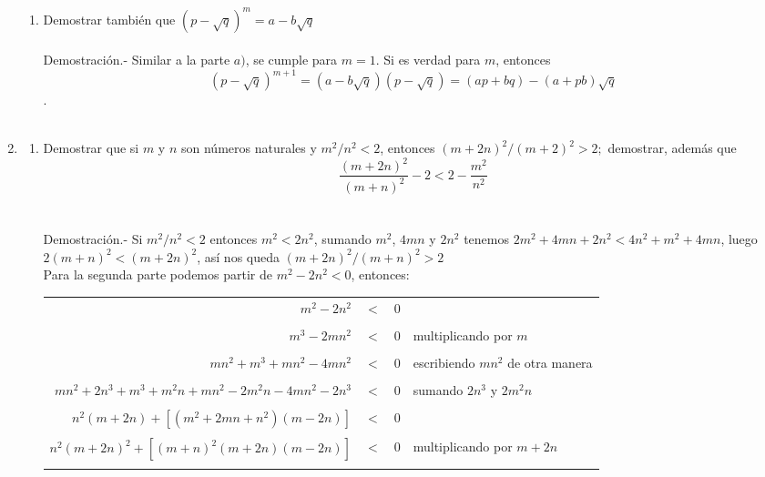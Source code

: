 \begin{enumerate}
\begin{enumerate}[\bfseries (a)]
      \item Demostrar también que $(p - \sqrt{q})^m = a - b\sqrt{q}$\\\\
      Demostración.- \; Similar a la parte $a)$, se cumple para $m=1$. Si es verdad para $m$, entonces $$(p-\sqrt{q})^{m+1} = (a - b\sqrt{q})(p - \sqrt{q}) = (ap+bq)-(a+pb)\sqrt{q}$$.\\\\
      \end{enumerate}

      \item 
      \begin{enumerate}[\bfseries (a)]
      \item Demostrar que si $m$ \; y \; $n$ son números naturales y $m^2/n^2 < 2$, entonces $\left( m+2n \right)^2 / \left( m + 2 \right)^2 > 2;$ demostrar, además que $$\dfrac{\left( m + 2n \right)^2}{\left( m + n \right)^2} - 2 < 2 - \dfrac{m^2}{n^2}$$\\\\
      Demostración.- \; Si $m^2/n^2 < 2$ entonces $m^2 < 2 n^2$, sumando $m^2$, $4mn$ y $2n^2$ tenemos $2m^2 + 4mn + 2n^2 < 4n^2 + m^2 + 4mn$, luego $2(m+n)^2 < (m+2n)^2$, así nos queda $(m + 2n)^2 / (m+n)^2 > 2$\\
      Para la segunda parte podemos partir de $m^2 - 2n^2<0$, entonces:
      \begin{center}
      \begin{tabular}{r c l l}
      $m^2 - 2n^2$&$<$&$0$&\\\\
      $m^3 - 2mn^2$&$<$&$0$&multiplicando por $m$\\\\
      $mn^2 + m^3 + mn^2 - 4mn^2$&$<$&$0$&escribiendo $mn^2$ de otra manera\\\\
      $mn^2 + 2n^3 + m^3 + m^2 n + mn^2 -2m^2 n - 4mn^2 -2n^3$&$<$&$0$&sumando $2n^3$ y $2m^2 n$\\\\
      $n^2 (m+2n) + \left[ (m^2 + 2mn + n^2)(m-2n) \right]$&$<$&$0$&\\\\
      $ n^2(m+2n)^2  +  \left[ (m+n)^2 (m+2n)(m-2n) \right]$&$<$&$0$&multiplicando por $m+2n$\\\\

\end{tabular}
\end{center}
\end{enumerate}
\end{enumerate}
